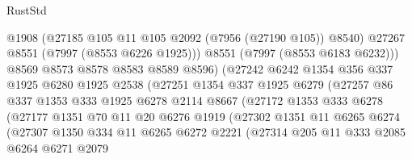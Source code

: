 \begin{lexlean}{RustStd}
\begin{coremodule}
                              @1908
                              (@27185 @105 @11 @105 @2092 (@7956 (@27190 @105)) @8540)
                              @27267
                              @8551
                              (@7997 (@8553 @6226 @1925)))
                            @8551
                            (@7997 (@8553 @6183 @6232)))
                          @8569
                          @8573
                          @8578
                          @8583
                          @8589
                          @8596)
                        (@27242
                          @6242
                          @1354
                          @356
                          @337
                          @1925
                          @6280
                          @1925
                          @2538
                          (@27251
                            @1354
                            @337
                            @1925
                            @6279
                            (@27257
                              @86
                              @337
                              @1353
                              @333
                              @1925
                              @6278
                              @2114
                              @8667
                              (@27172
                                @1353
                                @333
                                @6278
                                (@27177
                                  @1351
                                  @70
                                  @11
                                  @20
                                  @6276
                                  @1919
                                  (@27302
                                    @1351
                                    @11
                                    @6265
                                    @6274
                                    (@27307
                                      @1350
                                      @334
                                      @11
                                      @6265
                                      @6272
                                      @2221
                                      (@27314
                                        @205
                                        @11
                                        @333
                                        @2085
                                        @6264
                                        @6271
                                        @2079

\end{coremodule}
\end{lexlean}
